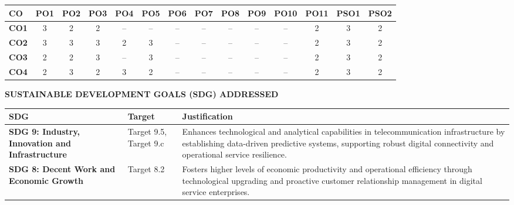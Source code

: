 \documentclass[12pt,a4paper]{report}
\begin{document}
\vspace{0.3cm}
\begin{table}[H]
\centering
\small
\begin{tabular}{|l|c|c|c|c|c|c|c|c|c|c|c|c|c|}
\hline
\textbf{CO} & \textbf{PO1} & \textbf{PO2} & \textbf{PO3} & \textbf{PO4} & \textbf{PO5} & \textbf{PO6} & \textbf{PO7} & \textbf{PO8} & \textbf{PO9} & \textbf{PO10} & \textbf{PO11} & \textbf{PSO1} & \textbf{PSO2} \\
\hline
\textbf{CO1} & 3 & 2 & 2 & -- & -- & -- & -- & -- & -- & -- & 2 & 3 & 2 \\
\hline
\textbf{CO2} & 3 & 3 & 3 & 2 & 3 & -- & -- & -- & -- & -- & 2 & 3 & 2 \\
\hline
\textbf{CO3} & 2 & 2 & 3 & -- & 3 & -- & -- & -- & -- & -- & 2 & 3 & 2 \\
\hline
\textbf{CO4} & 2 & 3 & 2 & 3 & 2 & -- & -- & -- & -- & -- & 2 & 3 & 2 \\
\hline
\end{tabular}
\end{table}

\vspace{0.4cm}
\begin{center}
    {\bfseries\large SUSTAINABLE DEVELOPMENT GOALS (SDG) ADDRESSED\par}
\end{center}
\vspace{0.1cm}

\begin{table}[H]
\centering
\small
\begin{tabular}{|p{2.8cm}|p{2.2cm}|p{8.8cm}|}
\hline
\textbf{SDG} & \textbf{Target} & \textbf{Justification} \\
\hline
\textbf{SDG 9: Industry, Innovation and Infrastructure} & Target 9.5, Target 9.c & Enhances technological and analytical capabilities in telecommunication infrastructure by establishing data-driven predictive systems, supporting robust digital connectivity and operational service resilience. \\
\hline
\textbf{SDG 8: Decent Work and Economic Growth} & Target 8.2 & Fosters higher levels of economic productivity and operational efficiency through technological upgrading and proactive customer relationship management in digital service enterprises. \\
\hline
\end{tabular}
\end{table}

\newpage
\tableofcontents
\newpage
\listoftables
\newpage
\listoffigures
\end{document}
